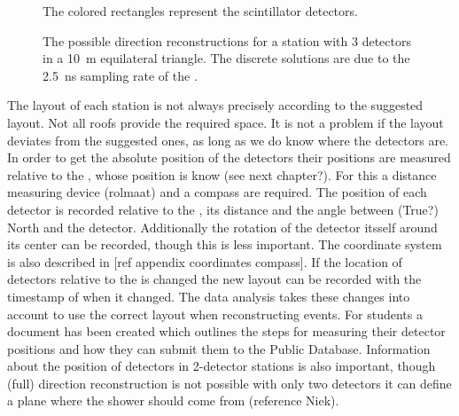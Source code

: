 \begin{figure}
    \centering
    
    \caption{ The colored
             rectangles represent the scintillator detectors.}
    \label{fig:4_detector_station}
\end{figure}

\begin{figure}
    \centering
    
    \caption{ The possible
             direction reconstructions for a station with 3 detectors in
             a \SI{10}{\meter} equilateral triangle. The discrete
             solutions are due to the \SI{2.5}{\nano\second} sampling
             rate of the \adcs.}
    \label{fig:discrete_directions}
\end{figure}

The layout of each station is not always precisely according to the suggested layout. Not all roofs provide the required space. It is not a problem if the layout deviates from the suggested ones, as long as we do know where the detectors are. In order to get the absolute position of the detectors their positions are measured relative to the \gps, whose position is know (see next chapter?). For this a distance measuring device (rolmaat) and a compass are required. The position of each detector is recorded relative to the \gps, its distance and the angle between (True?) North and the detector. Additionally the rotation of the detector itsself around its center can be recorded, though this is less important. The coordinate system is also described in [ref appendix coordinates compass]. If the location of detectors relative to the \gps is changed the new layout can be recorded with the timestamp of when it changed. The data analysis takes these changes into account to use the correct layout when reconstructing events. For students a document has been created which outlines the steps for measuring their detector positions and how they can submit them to the Public Database. Information about the position of detectors in 2-detector stations is also important, though (full) direction reconstruction is not possible with only two detectors it can define a plane where the shower should come from (reference Niek).
